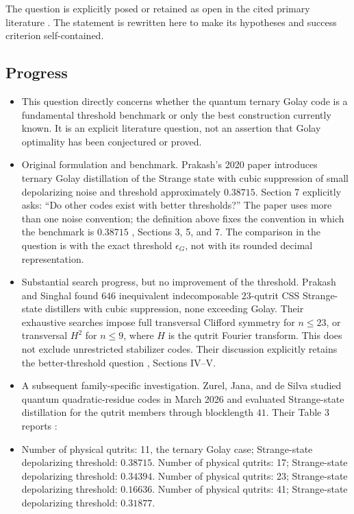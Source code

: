The question is explicitly posed or retained as open in the cited primary literature .  The statement is rewritten here to make its hypotheses and success criterion self-contained.

\subsection*{Progress}

\begin{itemize}
  \item This question directly concerns whether the quantum ternary Golay code is a fundamental threshold benchmark or only the best construction currently known. It is an explicit literature question, not an assertion that Golay optimality has been conjectured or proved.

  \item Original formulation and benchmark. Prakash's 2020 paper introduces ternary Golay distillation of the Strange state with cubic suppression of small depolarizing noise and threshold approximately $0.38715$. Section 7 explicitly asks: “Do other codes exist with better thresholds?” The paper uses more than one noise convention; the definition above fixes the convention in which the benchmark is $0.38715$ , Sections 3, 5, and 7. The comparison in the question is with the exact threshold $\epsilon_G$, not with its rounded decimal representation.

  \item Substantial search progress, but no improvement of the threshold. Prakash and Singhal found $646$ inequivalent indecomposable $23$-qutrit CSS Strange-state distillers with cubic suppression, none exceeding Golay. Their exhaustive searches impose full transversal Clifford symmetry for $n\le23$, or transversal $H^2$ for $n\le9$, where $H$ is the qutrit Fourier transform. This does not exclude unrestricted stabilizer codes. Their discussion explicitly retains the better-threshold question , Sections IV–V.

  \item A subsequent family-specific investigation. Zurel, Jana, and de Silva studied quantum quadratic-residue codes in March 2026 and evaluated Strange-state distillation for the qutrit members through blocklength $41$. Their Table 3 reports :

  \item Number of physical qutrits: 11, the ternary Golay case; Strange-state depolarizing threshold: $0.38715$.
Number of physical qutrits: 17; Strange-state depolarizing threshold: $0.34394$.
Number of physical qutrits: 23; Strange-state depolarizing threshold: $0.16636$.
Number of physical qutrits: 41; Strange-state depolarizing threshold: $0.31877$.


\end{itemize}
